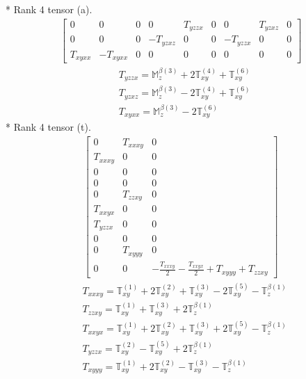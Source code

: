 \documentclass[fleqn,8pt,landscape]{jsarticle}
\begin{document}
* Rank 4 tensor (a).
\begin{align*}
\begin{bmatrix} 0 & 0 & 0 & 0 & T_{yzzx} & 0 & 0 & T_{yzxz} & 0 \\ 0 & 0 & 0 & - T_{yzxz} & 0 & 0 & - T_{yzzx} & 0 & 0 \\ T_{xyxx} & - T_{xyxx} & 0 & 0 & 0 & 0 & 0 & 0 & 0 \end{bmatrix}
\end{align*}
\begin{align*}
& T_{yzzx} = \mathbb{M}_{z}^{\beta(3)} + 2 \mathbb{T}_{xy}^{(4)} + \mathbb{T}_{xy}^{(6)} \\
& T_{yzxz} = \mathbb{M}_{z}^{\beta(3)} - 2 \mathbb{T}_{xy}^{(4)} + \mathbb{T}_{xy}^{(6)} \\
& T_{xyxx} = \mathbb{M}_{z}^{\beta(3)} - 2 \mathbb{T}_{xy}^{(6)}
\end{align*}
* Rank 4 tensor (t).
\begin{align*}
\begin{bmatrix} 0 & T_{xxxy} & 0 \\ T_{xxxy} & 0 & 0 \\ 0 & 0 & 0 \\ 0 & 0 & 0 \\ 0 & T_{zzxy} & 0 \\ T_{xxyx} & 0 & 0 \\ T_{yzzx} & 0 & 0 \\ 0 & 0 & 0 \\ 0 & T_{xyyy} & 0 \\ 0 & 0 & - \frac{T_{xxxy}}{2} - \frac{T_{xxyx}}{2} + T_{xyyy} + T_{zzxy} \end{bmatrix}
\end{align*}
\begin{align*}
& T_{xxxy} = \mathbb{T}_{xy}^{(1)} + 2 \mathbb{T}_{xy}^{(2)} + \mathbb{T}_{xy}^{(3)} - 2 \mathbb{T}_{xy}^{(5)} - \mathbb{T}_{z}^{\beta(1)} \\
& T_{zzxy} = \mathbb{T}_{xy}^{(1)} + \mathbb{T}_{xy}^{(3)} + 2 \mathbb{T}_{z}^{\beta(1)} \\
& T_{xxyx} = \mathbb{T}_{xy}^{(1)} + 2 \mathbb{T}_{xy}^{(2)} + \mathbb{T}_{xy}^{(3)} + 2 \mathbb{T}_{xy}^{(5)} - \mathbb{T}_{z}^{\beta(1)} \\
& T_{yzzx} = \mathbb{T}_{xy}^{(2)} - \mathbb{T}_{xy}^{(5)} + 2 \mathbb{T}_{z}^{\beta(1)} \\
& T_{xyyy} = \mathbb{T}_{xy}^{(1)} + 2 \mathbb{T}_{xy}^{(2)} - \mathbb{T}_{xy}^{(3)} - \mathbb{T}_{z}^{\beta(1)}
\end{align*}
\end{document}
